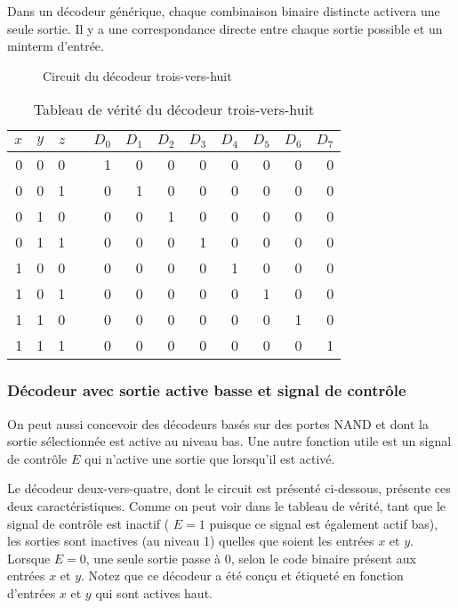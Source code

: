 \documentclass[11pt]{article}
\begin{document}
Dans un décodeur générique, chaque combinaison binaire distincte
activera une seule sortie. Il y a une correspondance directe entre
chaque sortie possible et un minterm d'entrée.

\begin{figure}[htbp]
\centering

\caption{\label{fig:orgad0b703}Circuit du décodeur trois-vers-huit}
\end{figure}


\begin{table}[htbp]
\caption{\label{tab:org3222a7d}Tableau de vérité du décodeur trois-vers-huit}
\centering
\begin{tabular}{rrrlrrrrrrrr}
\(x\) & \(y\) & \(z\) &  & \(D_0\) & \(D_1\) & \(D_2\) & \(D_3\) & \(D_4\) & \(D_5\) & \(D_6\) & \(D_7\)\\[0pt]
\hline
0 & 0 & 0 &  & 1 & 0 & 0 & 0 & 0 & 0 & 0 & 0\\[0pt]
0 & 0 & 1 &  & 0 & 1 & 0 & 0 & 0 & 0 & 0 & 0\\[0pt]
0 & 1 & 0 &  & 0 & 0 & 1 & 0 & 0 & 0 & 0 & 0\\[0pt]
0 & 1 & 1 &  & 0 & 0 & 0 & 1 & 0 & 0 & 0 & 0\\[0pt]
1 & 0 & 0 &  & 0 & 0 & 0 & 0 & 1 & 0 & 0 & 0\\[0pt]
1 & 0 & 1 &  & 0 & 0 & 0 & 0 & 0 & 1 & 0 & 0\\[0pt]
1 & 1 & 0 &  & 0 & 0 & 0 & 0 & 0 & 0 & 1 & 0\\[0pt]
1 & 1 & 1 &  & 0 & 0 & 0 & 0 & 0 & 0 & 0 & 1\\[0pt]
\end{tabular}
\end{table}

\subsubsection{Décodeur avec sortie active basse et signal de contrôle}
\label{sec:orgdc3413e}

On peut aussi concevoir des décodeurs basés sur des portes NAND et
dont la sortie sélectionnée est active au niveau bas. Une autre
fonction utile est un signal de contrôle \(E\) qui n'active une sortie
que lorsqu'il est activé.

Le décodeur deux-vers-quatre, dont le circuit est présenté ci-dessous,
présente ces deux caractéristiques. Comme on peut voir dans le tableau
de vérité, tant que le signal de contrôle est inactif ( \(E = 1\)
puisque ce signal est également actif bas), les sorties sont inactives
(au niveau 1) quelles que soient les entrées \(x\) et \(y\). Lorsque
\(E = 0\), une seule sortie passe à 0, selon le code binaire présent
aux entrées \(x\) et \(y\). Notez que ce décodeur a été conçu et
étiqueté en fonction d'entrées \(x\) et \(y\) qui sont actives haut.
\end{document}
